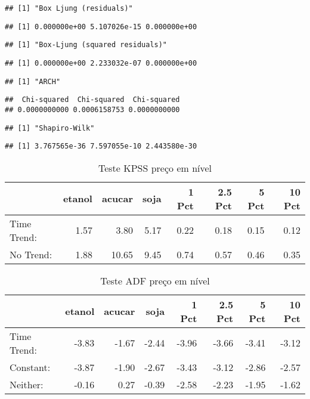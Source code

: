\documentclass[]{article}
\begin{document}
\begin{verbatim}
## [1] "Box Ljung (residuals)"
\end{verbatim}

\begin{verbatim}
## [1] 0.000000e+00 5.107026e-15 0.000000e+00
\end{verbatim}

\begin{verbatim}
## [1] "Box-Ljung (squared residuals)"
\end{verbatim}

\begin{verbatim}
## [1] 0.000000e+00 2.233032e-07 0.000000e+00
\end{verbatim}

\begin{verbatim}
## [1] "ARCH"
\end{verbatim}

\begin{verbatim}
##  Chi-squared  Chi-squared  Chi-squared 
## 0.0000000000 0.0006158753 0.0000000000
\end{verbatim}

\begin{verbatim}
## [1] "Shapiro-Wilk"
\end{verbatim}

\begin{verbatim}
## [1] 3.767565e-36 7.597055e-10 2.443580e-30
\end{verbatim}

\begin{longtable}[t]{lrrrrrrr}
\caption{\label{tab:ADF e KPSS nivel}Teste KPSS preço em nível}\\
\toprule
  & etanol & acucar & soja & 1 Pct & 2.5 Pct & 5 Pct & 10 Pct\\
\midrule
Time Trend: & 1.57 & 3.80 & 5.17 & 0.22 & 0.18 & 0.15 & 0.12\\
No Trend: & 1.88 & 10.65 & 9.45 & 0.74 & 0.57 & 0.46 & 0.35\\
\bottomrule
\end{longtable}

\begin{longtable}[t]{lrrrrrrr}
\caption{\label{tab:ADF e KPSS nivel}Teste ADF preço em nível}\\
\toprule
  & etanol & acucar & soja & 1 Pct & 2.5 Pct & 5 Pct & 10 Pct\\
\midrule
Time Trend: & -3.83 & -1.67 & -2.44 & -3.96 & -3.66 & -3.41 & -3.12\\
Constant: & -3.87 & -1.90 & -2.67 & -3.43 & -3.12 & -2.86 & -2.57\\
Neither: & -0.16 & 0.27 & -0.39 & -2.58 & -2.23 & -1.95 & -1.62\\
\bottomrule
\end{longtable}
\end{document}
